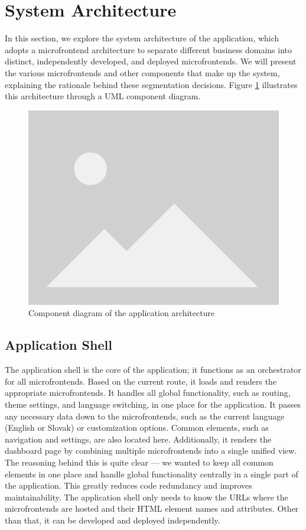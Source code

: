 \section{System Architecture}
In this section, we explore the system architecture of the application, which adopts a microfrontend architecture to separate different business domains into distinct, independently developed, and deployed microfrontends. We will present the various microfrontends and other components that make up the system, explaining the rationale behind these segmentation decisions. Figure \ref{fig:app-architecture} illustrates this architecture through a UML component diagram.

\begin{figure}[h]  
    \centerline{\includegraphics[width=.5\textwidth]{images/placeholder.png}}  
    \caption[Application architecture component diagram]{Component diagram of the application architecture}  
    \label{fig:app-architecture}  
\end{figure}

\subsection{Application Shell}
The application shell is the core of the application; it functions as an orchestrator for all microfrontends. Based on the current route, it loads and renders the appropriate microfrontends. It handles all global functionality, such as routing, theme settings, and language switching, in one place for the application. It passes any necessary data down to the microfrontends, such as the current language (English or Slovak) or customization options. Common elements, such as navigation and settings, are also located here. Additionally, it renders the dashboard page by combining multiple microfrontends into a single unified view. \\

\noindent
The reasoning behind this is quite clear — we wanted to keep all common elements in one place and handle global functionality centrally in a single part of the application. This greatly reduces code redundancy and improves maintainability. The application shell only needs to know the URLs where the microfrontends are hosted and their HTML element names and attributes. Other than that, it can be developed and deployed independently.

